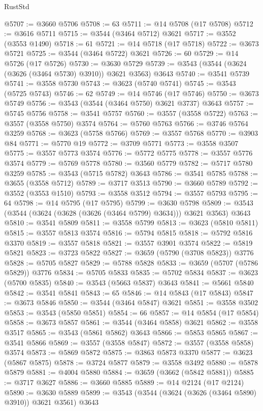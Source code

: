 \begin{lexlean}{RustStd}
\begin{coremodule}
@5707 := @3660 @5706
@5708 := 63
@5711 := @14 @5708 (@17 @5708)
@5712 := @3616 @5711
@5715 := @3544 (@3464 @5712) @3621
@5717 := @3552 (@3553 @1490)
@5718 := 61
@5721 := @14 @5718 (@17 @5718)
@5722 := @3673 @5721
@5725 := @3544 (@3464 @5722) @3621
@5726 := 60
@5729 := @14 @5726 (@17 @5726)
@5730 := @3630 @5729
@5739 := @3543 (@3544 (@3624 (@3626 (@3464 @5730) @3910)) @3621 @3563) @3643
@5740 := @3541 @5739
@5741 := @3558 @5730
@5743 := @3623 (@5740 @5741)
@5745 := @3543 (@5725 @5743)
@5746 := 62
@5749 := @14 @5746 (@17 @5746)
@5750 := @3673 @5749
@5756 := @3543 (@3544 (@3464 @5750) @3621 @3737) @3643
@5757 := @5745 @5756
@5758 := @3541 @5757
@5760 := @3557 (@3558 @5722)
@5763 := @3557 (@3558 @5750) @3574
@5764 := @5760 @5763
@5766 := @3746 @5764 @3259
@5768 := @3623 (@5758 @5766)
@5769 := @3557 @5768
@5770 := @3903 @84
@5771 := @5770 @19
@5772 := @3709 @5771
@5773 := @3558 @3507
@5775 := @3557 @5773 @3574
@5776 := @5772 @5775
@5778 := @3557 @5776 @3574
@5779 := @5769 @5778
@5780 := @3560 @5779
@5782 := @5717 @5780 @3259
@5785 := @3543 (@5715 @5782) @3643
@5786 := @3541 @5785
@5788 := @3655 (@3558 @5712)
@5789 := @3717 @3513
@5790 := @3660 @5789
@5792 := @3552 (@3553 @1510)
@5793 := @3558 @3512
@5794 := @3557 @5793
@5795 := 64
@5798 := @14 @5795 (@17 @5795)
@5799 := @3630 @5798
@5809 := @3543 (@3544 (@3624 (@3628 (@3626 (@3464 @5799) @3634))) @3621 @3563) @3643
@5810 := @3541 @5809
@5811 := @3558 @5799
@5813 := @3623 (@5810 @5811)
@5815 := @3557 @5813 @3574
@5816 := @5794 @5815
@5818 := @5792 @5816 @3370
@5819 := @3557 @5818
@5821 := @3557 @3901 @3574
@5822 := @5819 @5821
@5823 := @3723 @5822
@5827 := @3659 (@5790 (@3708 @5823)) @3776
@5828 := @5705 @5827
@5829 := @5788 @5828
@5833 := @3659 (@5707 (@5786 @5829)) @3776
@5834 := @5705 @5833
@5835 := @5702 @5834
@5837 := @3623 (@5700 @5835)
@5840 := @3543 (@5663 @5837) @3643
@5841 := @5661 @5840
@5842 := @3541 @5841
@5843 := 65
@5846 := @14 @5843 (@17 @5843)
@5847 := @3673 @5846
@5850 := @3544 (@3464 @5847) @3621
@5851 := @3558 @3502
@5853 := @3543 (@5850 @5851)
@5854 := 66
@5857 := @14 @5854 (@17 @5854)
@5858 := @3673 @5857
@5861 := @3544 (@3464 @5858) @3621
@5862 := @3558 @3517
@5865 := @3543 (@5861 @5862) @3643
@5866 := @5853 @5865
@5867 := @3541 @5866
@5869 := @3557 (@3558 @5847)
@5872 := @3557 (@3558 @5858) @3574
@5873 := @5869 @5872
@5875 := @3863 @5873 @3370
@5877 := @3623 (@5867 @5875)
@5878 := @3724 @5877
@5879 := @3558 @3492
@5880 := @5878 @5879
@5881 := @4004 @5880
@5884 := @3659 (@3662 (@5842 @5881))
@5885 := @3717 @3627
@5886 := @3660 @5885
@5889 := @14 @2124 (@17 @2124)
@5890 := @3630 @5889
@5899 := @3543 (@3544 (@3624 (@3626 (@3464 @5890) @3910)) @3621 @3561) @3643

\end{coremodule}
\end{lexlean}
